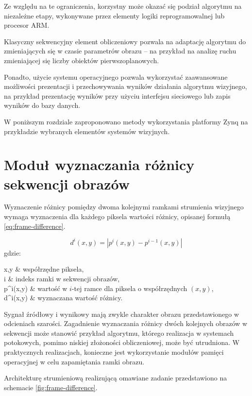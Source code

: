 Ze względu na te ograniczenia, korzystny może okazać się podział algorytmu na niezależne etapy, wykonywane przez elementy logiki reprogramowalnej lub procesor ARM. 

Klasyczny sekwencyjny element obliczeniowy pozwala na adaptację algorytmu do zmieniających się w czasie parametrów obrazu -- na przykład na analizę ruchu zmieniającej się liczby obiektów pierwszoplanowych.

Ponadto, użycie systemu operacyjnego pozwala wykorzystać zaawansowane możliwości prezentacji i przechowywania wyników działania algorytmu wizyjnego, na przykład prezentację wyników przy użyciu interfejsu sieciowego lub zapis wyników do bazy danych.

W poniższym rozdziale zaproponowano metody wykorzystania platformy Zynq na przykładzie wybranych elementów systemów wizyjnych.

\section{Moduł wyznaczania różnicy sekwencji obrazów}

Wyznaczenie różnicy pomiędzy dwoma kolejnymi ramkami strumienia wizyjnego wymaga wyznaczenia dla każdego piksela wartości różnicy, opisanej formułą \ref{eq:frame-difference}.

\begin{equation}
\label{eq:frame-difference}
d^i(x,y) = | p^i(x,y) - p^{i-1}(x,y) |
\end{equation}
gdzie:
\begin{conditions}
	x,y & współrzędne piksela, \\
	i & indeks ramki w sekwencji obrazów, \\
	p^i(x,y) & wartość w $i$-tej ramce dla piksela o współrzędnych $(x,y)$, \\
	d^i(x,y) & wyznaczana wartość różnicy. \\
\end{conditions}

Sygnał źródłowy i wynikowy  mają zwykle charakter obrazu przedstawionego w odcieniach szarości. 
Zagadnienie wyznaczania różnicy dwóch kolejnych obrazów w sekwencji może stanowić przykład algorytmu, którego realizacja w systemach potokowych, pomimo niskiej złożoności obliczeniowej, może być utrudniona. W praktycznych realizacjach, konieczne jest wykorzystanie modułów pamięci operacyjnej w celu zapamiętania ramki obrazu.

Architekturę strumieniową realizującą omawiane zadanie przedstawiono na schemacie \ref{fig:frame-difference}.

